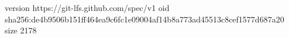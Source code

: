 version https://git-lfs.github.com/spec/v1
oid sha256:de4b9506b151ff464ea9c6fc1e09004af14b8a773ad45513c8cef1577d687a20
size 2178
